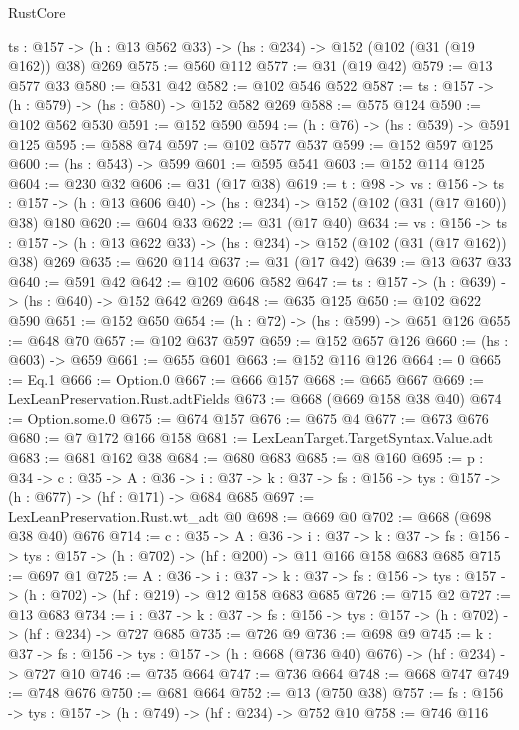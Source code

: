 \begin{lexlean}{RustCore}
\begin{coremodule}
  {ts : @157} -> (h : @13 @562 @33) -> (hs : @234) -> @152 (@102 (@31 (@19 @162)) @38) @269
@575 := @560 @112
@577 := @31 (@19 @42)
@579 := @13 @577 @33
@580 := @531 @42
@582 := @102 @546 @522
@587 := {ts : @157} -> (h : @579) -> (hs : @580) -> @152 @582 @269
@588 := @575 @124
@590 := @102 @562 @530
@591 := @152 @590
@594 := (h : @76) -> (hs : @539) -> @591 @125
@595 := @588 @74
@597 := @102 @577 @537
@599 := @152 @597 @125
@600 := (hs : @543) -> @599
@601 := @595 @541
@603 := @152 @114 @125
@604 := @230 @32
@606 := @31 (@17 @38)
@619 := {t : @98} ->
  {vs : @156} ->
  {ts : @157} -> (h : @13 @606 @40) -> (hs : @234) -> @152 (@102 (@31 (@17 @160)) @38) @180
@620 := @604 @33
@622 := @31 (@17 @40)
@634 := {vs : @156} ->
  {ts : @157} -> (h : @13 @622 @33) -> (hs : @234) -> @152 (@102 (@31 (@17 @162)) @38) @269
@635 := @620 @114
@637 := @31 (@17 @42)
@639 := @13 @637 @33
@640 := @591 @42
@642 := @102 @606 @582
@647 := {ts : @157} -> (h : @639) -> (hs : @640) -> @152 @642 @269
@648 := @635 @125
@650 := @102 @622 @590
@651 := @152 @650
@654 := (h : @72) -> (hs : @599) -> @651 @126
@655 := @648 @70
@657 := @102 @637 @597
@659 := @152 @657 @126
@660 := (hs : @603) -> @659
@661 := @655 @601
@663 := @152 @116 @126
@664 := 0
@665 := Eq.{1}
@666 := Option.{0}
@667 := @666 @157
@668 := @665 @667
@669 := LexLeanPreservation.Rust.adtFields
@673 := @668 (@669 @158 @38 @40)
@674 := Option.some.{0}
@675 := @674 @157
@676 := @675 @4
@677 := @673 @676
@680 := @7 @172 @166 @158
@681 := LexLeanTarget.TargetSyntax.Value.adt
@683 := @681 @162 @38
@684 := @680 @683
@685 := @8 @160
@695 := {p : @34} ->
  {c : @35} ->
  {A : @36} ->
  {i : @37} -> {k : @37} -> {fs : @156} -> {tys : @157} -> (h : @677) -> (hf : @171) -> @684 @685
@697 := LexLeanPreservation.Rust.wt_adt @0
@698 := @669 @0
@702 := @668 (@698 @38 @40) @676
@714 := {c : @35} ->
  {A : @36} ->
  {i : @37} ->
  {k : @37} -> {fs : @156} -> {tys : @157} -> (h : @702) -> (hf : @200) -> @11 @166 @158 @683 @685
@715 := @697 @1
@725 := {A : @36} ->
  {i : @37} ->
  {k : @37} -> {fs : @156} -> {tys : @157} -> (h : @702) -> (hf : @219) -> @12 @158 @683 @685
@726 := @715 @2
@727 := @13 @683
@734 := {i : @37} ->
  {k : @37} -> {fs : @156} -> {tys : @157} -> (h : @702) -> (hf : @234) -> @727 @685
@735 := @726 @9
@736 := @698 @9
@745 := {k : @37} ->
  {fs : @156} -> {tys : @157} -> (h : @668 (@736 @40) @676) -> (hf : @234) -> @727 @10
@746 := @735 @664
@747 := @736 @664
@748 := @668 @747
@749 := @748 @676
@750 := @681 @664
@752 := @13 (@750 @38)
@757 := {fs : @156} -> {tys : @157} -> (h : @749) -> (hf : @234) -> @752 @10
@758 := @746 @116

\end{coremodule}
\end{lexlean}

